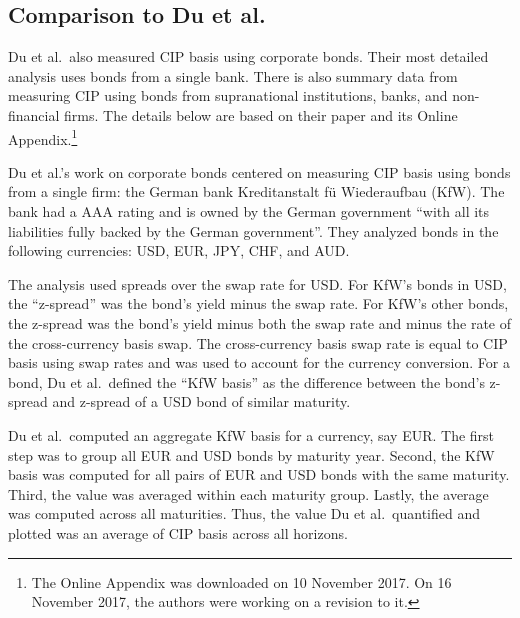 

\subsection{Comparison to Du et al.}

Du et al.\ also measured CIP basis using corporate bonds.  Their most detailed analysis uses bonds from a single bank.  There is also summary data from measuring CIP using bonds from supranational institutions, banks, and non-financial firms.  The details below are based on their paper and its Online Appendix.\footnote{The Online Appendix was downloaded on 10 November 2017.  On 16 November 2017, the authors were working on a revision to it.\cite{Du_email1}}

Du et al.'s work on corporate bonds centered on measuring CIP basis using bonds from a single firm: the German bank Kreditanstalt f\"u Wiederaufbau (KfW).\cite{Du2017}  The bank had a AAA rating and is owned by the German government ``with all its liabilities fully backed by the German government''.\cite{Du2017}    They analyzed bonds in the following currencies: USD, EUR, JPY, CHF, and AUD.  

The analysis used spreads over the swap rate for USD.  For KfW's bonds in USD, the ``z-spread'' was the bond's yield minus the swap rate.  For KfW's other bonds, the z-spread was the bond's yield minus both the swap rate and minus the rate of the cross-currency basis swap.  The cross-currency basis swap rate is equal to CIP basis using swap rates and was used to account for the currency conversion.   For a bond, Du et al.\ defined the ``KfW basis'' as the difference between the bond's z-spread and z-spread of a USD bond of similar maturity.

Du et al.\ computed an aggregate KfW basis for a currency, say EUR.  The first step was to group all EUR and USD bonds by maturity year.  Second, the KfW basis was computed for all pairs of EUR and USD bonds with the same maturity.  Third, the value was averaged within each maturity group.  Lastly, the average was computed across all maturities.\cite{Du_email1}   Thus, the value Du et al.\ quantified and plotted was an average of CIP basis across all horizons.

